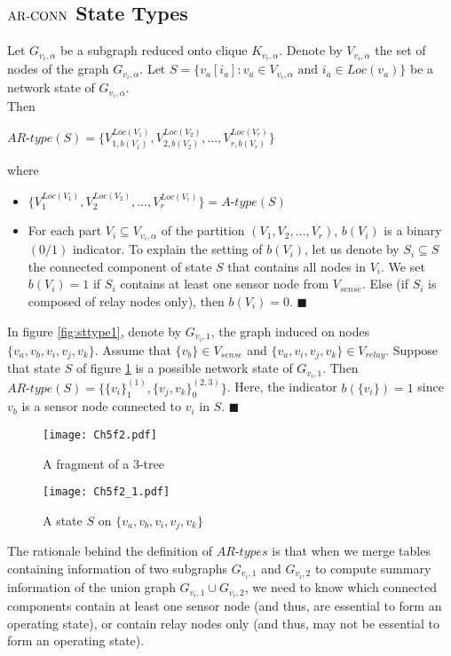 \subsection{${\mathrm {AR\mbox{-}CONN}}$ State Types}
\begin{definition}\label{def:arconnstatety}
\normalfont
Let $G_{v_i,\alpha}$ be a subgraph reduced onto clique $K_{v_i,\alpha}$. Denote by $V_{v_i,\alpha}$ the set of nodes of the graph $G_{v_i,\alpha}$. Let $S=\{v_a[i_a] :v_a\in V_{v_i,\alpha} \mbox{ and } i_a \in Loc(v_a)\}$  be a network state of $G_{v_i,\alpha}$. \\Then\\
\centerline{
$AR\mbox{-}type(S)=\{V_{1,b(V_1)}^{Loc(V_1)}, V_{2,b(V_2)}^{Loc(V_2)}, \ldots, V^{Loc(V_r)}_{r,b(V_r)} \}$}

where
\begin{itemize}[noitemsep]
\item $\{V_1^{Loc(V_1)}, V_2^{Loc(V_2)}, \ldots, V_r^{Loc(V_r)}\}=A\mbox{-}type(S)$
\item For each part $V_i\subseteq V_{v_i,\alpha}$ of the partition $(V_1,V_2,\ldots,V_r)$, $b(V_i)$ is a binary $(0/1)$ indicator. To explain the setting of $b(V_i)$, let us denote by $S_i \subseteq S$ the connected component of state $S$ that contains all nodes in $V_i$. We set $b(V_i)=1$ if $S_i$ contains at least one sensor node from $V_{sense}$. Else (if $S_i$ is composed of relay nodes only), then $b(V_i)=0$.
 $\blacksquare$
\end{itemize}
\end{definition}

\begin{example}
\normalfont
In figure \ref{fig:sttype1}, denote by $G_{v_i,1}$, the graph induced on nodes $\{v_a,v_b,v_i,v_j,v_k\}$. Assume that $\{v_b\}\in V_{sense}$ and $\{v_a,v_i,v_j,v_k\} \in V_{relay}$. Suppose that state $S$ of figure \ref{fig:sttype1_node} is a possible network state of $G_{v_i,1}$. Then $AR\mbox{-}type(S)=\big \{\{v_i\}_1^{(1)},\{v_j,v_k\}_0^{(2,3)}\big\}$. Here, the indicator $b(\{v_i\})=1$ since $v_b$ is a sensor node connected to $v_i$ in $S$. $\blacksquare$
\end{example}
\begin{figure}[!htb]
\begin{minipage}[]{0.5\linewidth}
\texttt{[image: Ch5f2.pdf]}
\caption{A fragment of a 3-tree}
\label{fig:sttype1}
\end{minipage}
\begin{minipage}{0.5\linewidth}
\nwline
\texttt{[image: Ch5f2\_1.pdf]}
\caption{A state $S$ on $\{v_a,v_b,v_i,v_j,v_k\}$}
\label{fig:sttype1_node}
\end{minipage}
\end{figure}
The rationale behind the definition of $AR\mbox{-}types$ is that when we merge tables containing information of two subgraphs $G_{v_i,1}$ and $G_{v_i,2}$ to compute summary information of the union graph $G_{v_i,1}\cup G_{v_i,2}$, we need to know which connected components contain at least one sensor node (and thus, are essential to form an operating state), or contain relay nodes only (and thus, may not be essential to form an operating state). 
